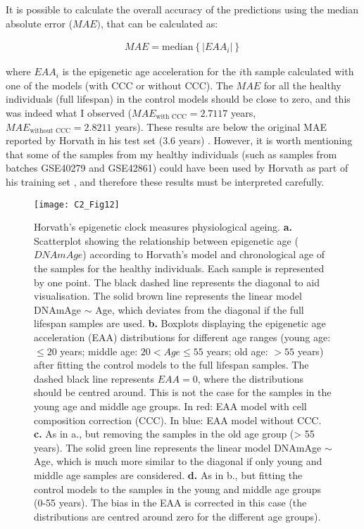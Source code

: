 It is possible to calculate the overall accuracy of the predictions using the median absolute error ($MAE)$, that can be calculated as:

\begin{align}
 	MAE = \mathrm{median}\left\{|EAA_i|\right\}
\end{align}

where $EAA_i$ is the epigenetic age acceleration for the $i$th sample calculated with one of the models (with CCC or without CCC). The $MAE$ for all the healthy individuals (full lifespan) in the control models should be close to zero, and this was indeed what I observed ($MAE_{\text{with CCC}} = 2.7117$ years, $MAE_{\text{without CCC}} = 2.8211$ years). These results are below the original MAE reported by Horvath in his test set (3.6 years) \cite{Horvath2013}. However, it is worth mentioning that some of the samples from my healthy individuals (such as samples from batches GSE40279 and GSE42861) could have been used by Horvath as part of his training set \cite{Horvath2013}, and therefore these results must be interpreted carefully. 

\begin{figure}[htbp!] 
	\centering
	\texttt{[image: C2\_Fig12]}
	\vspace*{2mm}    
	\caption[Horvath's epigenetic clock measures physiological ageing]{Horvath's epigenetic clock measures physiological ageing. \textbf{a.} Scatterplot showing the relationship between epigenetic age ($DNAmAge$) according to Horvath’s model \cite{Horvath2013} and chronological age of the samples for the healthy individuals. Each sample is represented by one point. The black dashed line represents the diagonal to aid visualisation. The solid brown line represents the linear model DNAmAge $\sim$ Age, which deviates from the diagonal if the full lifespan samples are used. \textbf{b.} Boxplots displaying the epigenetic age acceleration (EAA) distributions for different age ranges (young age: $\leq 20$ years; middle age: $20 < Age \leq 55$ years; old age: $> 55$ years) after fitting the control models to the full lifespan samples. The dashed black line represents $EAA = 0$, where the distributions should be centred around. This is not the case for the samples in the young age and middle age groups. In red: EAA model with cell composition correction (CCC). In blue: EAA model without CCC. \textbf{c.} As in a., but removing the samples in the old age group (> 55 years). The solid green line represents the linear model DNAmAge $\sim$ Age, which is much more similar to the diagonal if only young and middle age samples are considered. \textbf{d.} As in b., but fitting the control models to the samples in the young and middle age groups (0-55 years). The bias in the EAA is corrected in this case (the distributions are centred around zero for the different age groups).}
	\label{fig:c2_fig12}
\end{figure}   

